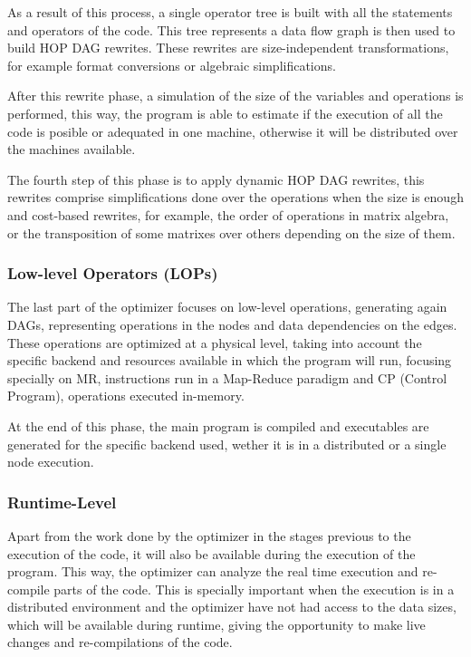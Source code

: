 \documentclass[11pt]{book} %
\begin{document}
        As a result of this process, a single operator tree is built with all the statements and operators of the code. This tree represents a data flow graph is then used to build HOP DAG rewrites. These rewrites are size-independent transformations, for example format conversions or algebraic simplifications.

        After this rewrite phase, a simulation of the size of the variables and operations is performed, this way, the program is able to estimate if the execution of all the code is posible or adequated in one machine, otherwise it will be distributed over the machines available.

        The fourth step of this phase is to apply dynamic HOP DAG rewrites, this rewrites comprise simplifications done over the operations when the size is enough and cost-based rewrites, for example, the order of operations in matrix algebra, or the transposition of some matrixes over others depending on the size of them.

      \subsubsection{Low-level Operators (LOPs)}

        The last part of the optimizer focuses on low-level operations, generating again DAGs, representing operations in the nodes and data dependencies on the edges. These operations are optimized at a physical level, taking into account the specific backend and resources available in which the program will run, focusing specially on MR, instructions run in a Map-Reduce paradigm and CP (Control Program), operations executed in-memory.

        At the end of this phase, the main program is compiled and executables are generated for the specific backend used, wether it is in a distributed or a single node execution.

      \subsubsection{Runtime-Level}

        Apart from the work done by the optimizer in the stages previous to the execution of the code, it will also be available during the execution of the program. This way, the optimizer can analyze the real time execution and re-compile parts of the code. This is specially important when the execution is in a distributed environment and the optimizer have not had access to the data sizes, which will be available during runtime, giving the opportunity to make live changes and re-compilations of the code.
\end{document}
